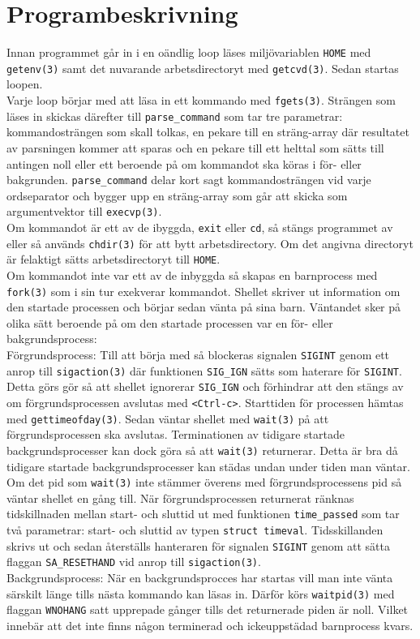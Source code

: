 \documentclass[a4paper]{article}
\begin{document}
\section*{Programbeskrivning}
Innan programmet går in i en oändlig loop läses miljövariablen \texttt{HOME} med  \texttt{getenv(3)} samt det nuvarande arbetsdirectoryt med \texttt{getcvd(3)}. Sedan startas loopen.
\\
Varje loop börjar med att läsa in ett kommando med \texttt{fgets(3)}. Strängen som läses in skickas därefter till \texttt{parse_command} som tar tre parametrar: kommandosträngen som skall tolkas, en pekare till en sträng-array där resultatet av parsningen kommer att sparas och en pekare till ett helttal som sätts till antingen noll eller ett beroende på om kommandot ska köras i för- eller bakgrunden. \texttt{parse_command} delar kort sagt kommandosträngen vid varje ordseparator och bygger upp en sträng-array som går att skicka som argumentvektor till \texttt{execvp(3)}. 
\\
Om kommandot är ett av de ibyggda, \texttt{exit} eller \texttt{cd}, så stängs programmet av eller så används \texttt{chdir(3)} för att bytt arbetsdirectory. Om det angivna directoryt är felaktigt sätts arbetsdirectoryt till \texttt{HOME}.
\\
Om kommandot inte var ett av de inbyggda så skapas en barnprocess med \texttt{fork(3)} som i sin tur exekverar kommandot. Shellet skriver ut information om den startade processen och börjar sedan vänta på sina barn. Väntandet sker på olika sätt beroende på om den startade processen var en för- eller bakgrundsprocess:
\\
Förgrundsprocess:
Till att börja med så blockeras signalen \texttt{SIGINT} genom ett anrop till \texttt{sigaction(3)} där funktionen \texttt{SIG_IGN} sätts som haterare för \texttt{SIGINT}. Detta görs gör så att shellet ignorerar \texttt{SIG_IGN} och förhindrar att den stängs av om förgrundsprocessen avslutas med \texttt{<Ctrl-c>}. Starttiden för processen hämtas med \texttt{gettimeofday(3)}. Sedan väntar shellet med  \texttt{wait(3)} på att förgrundsprocessen ska avslutas. Terminationen av tidigare startade backgrundsprocesser kan dock göra så att \texttt{wait(3)} returnerar. Detta är bra då tidigare startade backgrundsprocesser kan städas undan under tiden man väntar. Om det pid som \texttt{wait(3)} inte stämmer överens med förgrundsprocessens pid så väntar shellet en gång till.
När förgrundsprocessen returnerat ränknas tidskillnaden mellan start- och sluttid ut med funktionen \texttt{time_passed} som tar två parametrar: start- och sluttid av typen \texttt{struct timeval}. Tidsskillanden skrivs ut och sedan återställs hanteraren för signalen \texttt{SIGINT} genom att sätta flaggan \texttt{SA_RESETHAND} vid anrop till \texttt{sigaction(3)}.
\\
Backgrundsprocess:
När en backgrundsprocces har startas vill man inte vänta särskilt länge tills nästa kommando kan läsas in. Därför körs \texttt{waitpid(3)} med flaggan \texttt{WNOHANG} satt upprepade gånger tills det returnerade piden är noll. Vilket innebär att det inte finns någon terminerad och ickeuppstädad barnprocess kvars.
 
\end{document}
